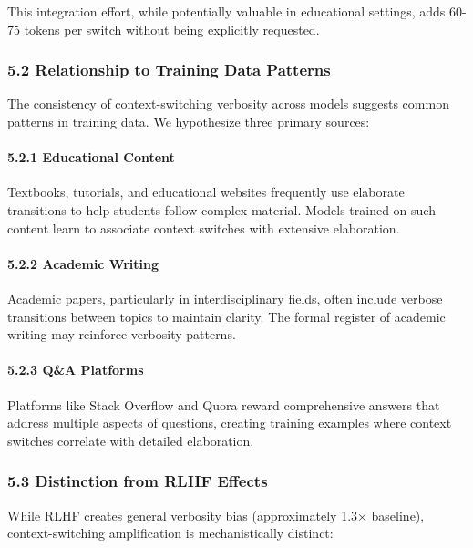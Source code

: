 \documentclass[
  11pt]{article}
\begin{document}
This integration effort, while potentially valuable in educational
settings, adds 60-75 tokens per switch without being explicitly
requested.

\subsubsection{5.2 Relationship to Training Data
Patterns}\label{relationship-to-training-data-patterns}

The consistency of context-switching verbosity across models suggests
common patterns in training data. We hypothesize three primary sources:

\paragraph{5.2.1 Educational Content}\label{educational-content}

Textbooks, tutorials, and educational websites frequently use elaborate
transitions to help students follow complex material. Models trained on
such content learn to associate context switches with extensive
elaboration.

\paragraph{5.2.2 Academic Writing}\label{academic-writing}

Academic papers, particularly in interdisciplinary fields, often include
verbose transitions between topics to maintain clarity. The formal
register of academic writing may reinforce verbosity patterns.

\paragraph{5.2.3 Q\&A Platforms}\label{qa-platforms}

Platforms like Stack Overflow and Quora reward comprehensive answers
that address multiple aspects of questions, creating training examples
where context switches correlate with detailed elaboration.

\subsubsection{5.3 Distinction from RLHF
Effects}\label{distinction-from-rlhf-effects}

While RLHF creates general verbosity bias (approximately 1.3× baseline),
context-switching amplification is mechanistically distinct:
\end{document}
